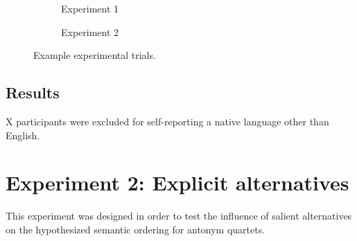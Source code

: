 \documentclass[10pt,letterpaper]{article}
\begin{document}
\begin{figure}[t]
	\centering
	\begin{subfigure}[t]{0.5\textwidth}
		\centering
		\caption{Experiment 1}\label{fig:expt1}		
	\end{subfigure}%
	\quad
	\begin{subfigure}[t]{0.5\textwidth}
		\centering
		\caption{Experiment 2}\label{fig:expt2}
	\end{subfigure}
	\caption{Example experimental trials.}\label{fig:expt-procedure}
\end{figure}


\subsection{Results}

X participants were excluded for self-reporting a native language other than English. 


\section{Experiment 2: Explicit alternatives}
This experiment was designed in order to test the influence of salient alternatives on the hypothesized semantic ordering for antonym quartets.
\end{document}
